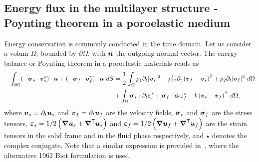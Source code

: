 \subsection{Energy flux in the multilayer structure - Poynting theorem in a poroelastic medium}
\label{app:poynting}

Energy conservation is commonly conducted in the time domain. Let us consider a volum $\Omega$, bounded by $\partial \Omega$, with $\boldsymbol n$ the outgoing normal vector. The energy balance or Poynting theorem in a poroelastic materials reads as~\cite{biot1956,dazel2008}
\begin{equation}
        \begin{aligned} 
           - \int_{\partial \Omega} (-\boldsymbol \sigma_s \cdot\boldsymbol v_s^\star)\cdot  \boldsymbol n +  (-\boldsymbol \sigma_f \cdot \boldsymbol v_f^\star) \cdot \boldsymbol n ~dS
            &= \frac {1} {2} \int_\Omega \rho_1 \partial_t |\boldsymbol v_s|^2 - \rho_{12}'\partial_t  \left(\boldsymbol v_f - \boldsymbol v_s \right)^2 + \rho_2 \partial_t |\boldsymbol v_f|^2~d\Omega \\
            &+ \int_\Omega  \boldsymbol \sigma_s : \partial_t\boldsymbol \varepsilon_s^\star + \boldsymbol \sigma_f :\partial_t\boldsymbol \varepsilon_f^\star - b \left(\boldsymbol v_s - \boldsymbol v_f\right)^2 ~d\Omega,
        \end{aligned}
        \label{eq:poynt_energy_balance}
    \end{equation}
where $\boldsymbol v_s=\partial_t \boldsymbol u_s$ and $\boldsymbol v_f=\partial_t \boldsymbol u_f$ are the velocity fields, $\boldsymbol \sigma_s$ and $\boldsymbol \sigma_f$ are the stress tensors, $\boldsymbol \varepsilon_s = 1 / 2 \left( \boldsymbol \nabla \boldsymbol u_s + \boldsymbol \nabla^\mathsf T \boldsymbol u_s \right)$ and $\boldsymbol \varepsilon_f = 1 / 2 \left( \boldsymbol \nabla \boldsymbol u_f + \boldsymbol \nabla^\mathsf T \boldsymbol u_f \right)$ are the strain tensors in the solid frame and in the fluid phase respectively, and $\star$ denotes the complex conjugate. Note that a similar expression is provided in~\cite{carcione1996}, where the alternative 1962 Biot formulation is used.

